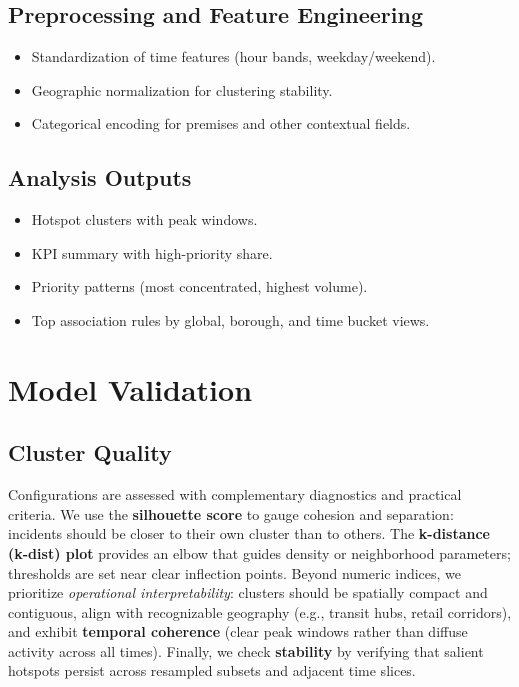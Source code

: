 \documentclass[11pt]{article}
\begin{document}
\subsection{Preprocessing and Feature Engineering}
\begin{itemize}[leftmargin=*]
  \item Standardization of time features (hour bands, weekday/weekend).
  \item Geographic normalization for clustering stability.
  \item Categorical encoding for premises and other contextual fields.
\end{itemize}

\subsection{Analysis Outputs}
\begin{itemize}[leftmargin=*]
  \item Hotspot clusters with peak windows.
  \item KPI summary with high-priority share.
  \item Priority patterns (most concentrated, highest volume).
  \item Top association rules by global, borough, and time bucket views.
\end{itemize}

\section{Model Validation}

\subsection{Cluster Quality}
Configurations are assessed with complementary diagnostics and practical criteria. We use the \textbf{silhouette score} to gauge cohesion and separation: incidents should be closer to their own cluster than to others. The \textbf{k-distance (k-dist) plot} provides an elbow that guides density or neighborhood parameters; thresholds are set near clear inflection points. Beyond numeric indices, we prioritize \emph{operational interpretability}: clusters should be spatially compact and contiguous, align with recognizable geography (e.g., transit hubs, retail corridors), and exhibit \textbf{temporal coherence} (clear peak windows rather than diffuse activity across all times). Finally, we check \textbf{stability} by verifying that salient hotspots persist across resampled subsets and adjacent time slices.
\end{document}
